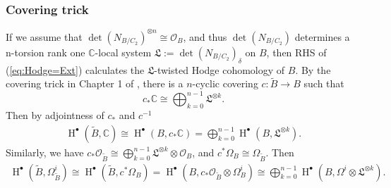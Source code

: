 \documentclass[12pt]{amsart}
\theoremstyle{definition}
\theoremstyle{remark}
\numberwithin{equation}{section}
\newcommand{\CC}{\mathbb{C}}
\newcommand{\shO}{\mathcal{O}}
\newcommand{\arw}{\longrightarrow}
\newcommand{\Hdot}{\operatorname{H}}
\begin{document}
\subsubsection{Covering trick}
If we assume that $\det(N_{B/C_2})^{\otimes n}\cong \shO_B$, and thus $\det(N_{B/C_2})$ determines a n-torsion rank one $\CC$-local system $\mathfrak{L}:=\det(N_{B/C_2})_{\delta}$ on $B$, then RHS of (\ref{eq:Hodge=Ext}) calculates the $\mathfrak{L}$-twisted Hodge cohomology of $B$. 
By the covering trick in Chapter 1 of \cite{barth2003compact}, there is a $n$-cyclic covering 
$c: \widetilde{B}\arw B$ such that $$c_{*}\CC\cong \bigoplus_{k=0}^{n-1}\mathfrak{L}^{\otimes k}.$$ Then by adjointness of $c_*$ and $c^{-1}$
\begin{align}\label{eq: coveringcoh}
    \Hdot^{\bullet}(\widetilde{B}, \CC)\cong \Hdot^{\bullet}(B, c_*\CC)=\bigoplus_{k=0}^{n-1}\Hdot^{\bullet}(B, \mathfrak{L}^{\otimes k}).
\end{align}
Similarly, we have $c_{*}\shO_{\widetilde{B}}\cong \bigoplus_{k=0}^{n-1}\mathfrak{L}^{\otimes k}\otimes \shO_B$, and $c^*\Omega_B\cong \Omega_{\widetilde{B}}$. Then 
\begin{align}\label{eq: coveringhodge}
    \Hdot^{\bullet}(\widetilde{B}, \Omega^i_{\widetilde{B}})\cong \Hdot^{\bullet}(\widetilde{B}, c^*{\Omega_B})=\Hdot^{\bullet}(B, c_*\shO_{\widetilde{B}}\otimes\Omega^i_B)\cong \bigoplus_{k=0}^{n-1}\Hdot^{\bullet}(B, \Omega^i\otimes\mathfrak{L}^{\otimes k}).
\end{align}
\end{document}
